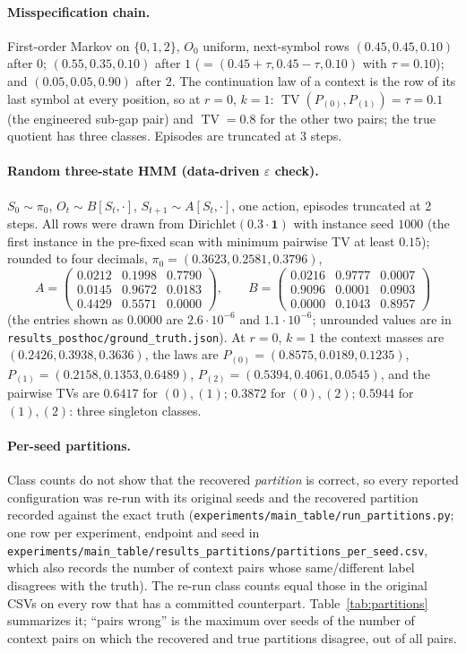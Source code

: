 \documentclass{article}
\newcommand{\eps}{\varepsilon}
\DeclareMathOperator{\TV}{TV}
\begin{document}
\paragraph{Misspecification chain.}
First-order Markov on $\{0,1,2\}$, $O_0$ uniform, next-symbol rows
$(0.45,0.45,0.10)$ after $0$; $(0.55,0.35,0.10)$ after $1$
($=(0.45+\tau,0.45-\tau,0.10)$ with $\tau=0.10$); and $(0.05,0.05,0.90)$
after $2$.  The continuation law of a context is the row of its last symbol
at every position, so at $r=0$, $k=1$: $\TV(P_{(0)},P_{(1)})=\tau=0.1$ (the
engineered sub-gap pair) and $\TV=0.8$ for the other two pairs; the true
quotient has three classes.  Episodes are truncated at 3 steps.

\paragraph{Random three-state HMM (data-driven $\eps$ check).}
$S_0\sim\pi_0$, $O_t\sim B[S_t,\cdot]$, $S_{t+1}\sim A[S_t,\cdot]$, one action,
episodes truncated at 2 steps.  All rows were drawn from
$\mathrm{Dirichlet}(0.3\cdot\mathbf 1)$ with instance seed $1000$ (the first
instance in the pre-fixed scan with minimum pairwise TV at least $0.15$);
rounded to four decimals,
$\pi_0=(0.3623,0.2581,0.3796)$,
\[
A=\begin{pmatrix}0.0212&0.1998&0.7790\\0.0145&0.9672&0.0183\\0.4429&0.5571&0.0000\end{pmatrix},\qquad
B=\begin{pmatrix}0.0216&0.9777&0.0007\\0.9096&0.0001&0.0903\\0.0000&0.1043&0.8957\end{pmatrix}
\]
(the entries shown as $0.0000$ are $2.6\cdot10^{-6}$ and $1.1\cdot10^{-6}$;
unrounded values are in \texttt{results\_posthoc/ground\_truth.json}).  At $r=0$,
$k=1$ the context masses are $(0.2426,0.3938,0.3636)$, the laws are
$P_{(0)}=(0.8575,0.0189,0.1235)$, $P_{(1)}=(0.2158,0.1353,0.6489)$,
$P_{(2)}=(0.5394,0.4061,0.0545)$, and the pairwise TVs are
$0.6417$ for $(0),(1)$; $0.3872$ for $(0),(2)$; $0.5944$ for $(1),(2)$:
three singleton classes.

\paragraph{Per-seed partitions.}
Class counts do not show that the recovered \emph{partition} is correct, so
every reported configuration was re-run with its original seeds and the
recovered partition recorded against the exact truth
(\texttt{experiments/main\_table/run\_partitions.py}; one row per
experiment, endpoint and seed in
\texttt{experiments/main\_table/results\_partitions/partitions\_per\_seed.csv}, which also
records the number of context pairs whose same/different label disagrees with
the truth).  The re-run class counts equal those in the original CSVs on
every row that has a committed counterpart.  Table~\ref{tab:partitions}
summarizes it; ``pairs wrong'' is the maximum over seeds of the number of
context pairs on which the recovered and true partitions disagree, out of all
pairs.
\end{document}
